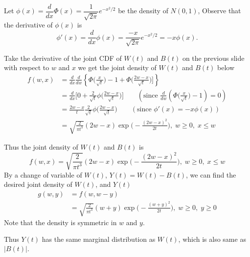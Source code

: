 \documentclass[letterpaper]{beamer}
\begin{document}
\begin{frame}
Let $\phi(x)=\dfrac{d}{dx}\Phi(x)=\dfrac{1}{\sqrt{2\pi}}e^{-x^2/2}$ be the density of $N(0,1)$,
Observe that the derivative of $\phi(x)$ is
$$\phi'(x)=\frac{d}{dx}\phi(x)=\frac{-x}{\sqrt{2\pi}}e^{-x^2/2}=-x\phi(x).$$

Take the derivative of the joint CDF of $W(t)$ and $B(t)$ on the previous slide with respect to $w$ and $x$
we get the joint density of $W(t)$ and $B(t)$ below
\begin{align*}
f(w,x)&=\frac{d}{dx}\frac{d}{dw}\left\{\Phi\Big(\frac{x}{\sqrt{t}}\Big)-1+\Phi\Big(\frac{2w-x}{\sqrt{t}}\Big)\Big]\right\}\\
&=\frac{d}{dx}\Big[0+\frac{2}{\sqrt{t}}\phi\Big(\frac{2w-x}{\sqrt{t}}\Big)\Big]\qquad(\text{since }\frac{d}{dw}\left(\Phi\Big(\frac{x}{\sqrt{t}}\Big)-1\right)=0)\\
&=\frac{2w-x}{t}\frac{2}{\sqrt{t}}\phi\Big(\frac{2w-x}{\sqrt{t}}\Big)\qquad(\text{since }\phi'(x)=-x\phi(x))\\
&=\sqrt{\frac{2}{\pi t^3}}(2w-x)\exp\Big(-\frac{(2w-x)^2}{2t}\Big),\; w\ge 0,\; x\le w
\end{align*}
\end{frame}
\begin{frame}
Thus the joint density of $W(t)$ and $B(t)$ is
$$
f(w,x)=\sqrt{\frac{2}{\pi t^3}}(2w-x)\exp\Big(-\frac{(2w-x)^2}{2t}\Big),\; w\ge 0,\; x\le w
$$
By a change of variable of $W(t)$, $Y(t)=W(t)-B(t)$, we can find the desired joint density of $W(t)$, and $Y(t)$
\begin{align*}
g(w,y)&=f(w,w-y)\\
&=\sqrt{\frac{2}{\pi t^3}}(w+y)\exp\Big(-\frac{(w+y)^2}{2t}\Big),\; w\ge 0,\; y\ge 0
\end{align*}
Note that the density is symmetric in $w$ and $y$.\par
Thus $Y(t)$ has the same marginal distribution as $W(t)$, which is also same as $|B(t)|.$
\end{frame}
\end{document}
